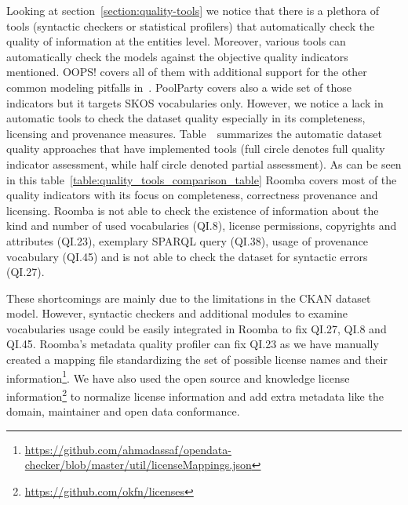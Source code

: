 Looking at section~\ref{section:quality-tools} we notice that there is a plethora of tools (syntactic checkers or statistical profilers) that automatically check the quality of information at the entities level. Moreover, various tools can automatically check the models against the objective quality indicators mentioned. OOPS! covers all of them with additional support for the other common modeling pitfalls in~\cite{Maria:KEOD:13}. PoolParty covers also a wide set of those indicators but it targets SKOS vocabularies only. However, we notice a lack in automatic tools to check the dataset quality especially in its completeness, licensing and provenance measures. Table~\ summarizes the automatic dataset quality approaches that have implemented tools (full circle denotes full quality indicator assessment, while half circle denoted partial assessment). As can be seen in this table~\ref{table:quality_tools_comparison_table} Roomba covers most of the quality indicators with its focus on completeness, correctness provenance and licensing. Roomba is not able to check the existence of information about the kind and number of used vocabularies (QI.8), license permissions, copyrights and attributes (QI.23), exemplary SPARQL query (QI.38), usage of provenance vocabulary (QI.45) and is not able to check the dataset for syntactic errors (QI.27).

These shortcomings are mainly due to the limitations in the CKAN dataset model. However, syntactic checkers and additional modules to examine vocabularies usage could be easily integrated in Roomba to fix QI.27, QI.8 and QI.45. Roomba's metadata quality profiler can fix QI.23 as we have manually created a mapping file standardizing the set of possible license names and their information\footnote{\url{https://github.com/ahmadassaf/opendata-checker/blob/master/util/licenseMappings.json}}. We have also used the open source and knowledge license information\footnote{\url{https://github.com/okfn/licenses}} to normalize license information and add extra metadata like the domain, maintainer and open data conformance.

